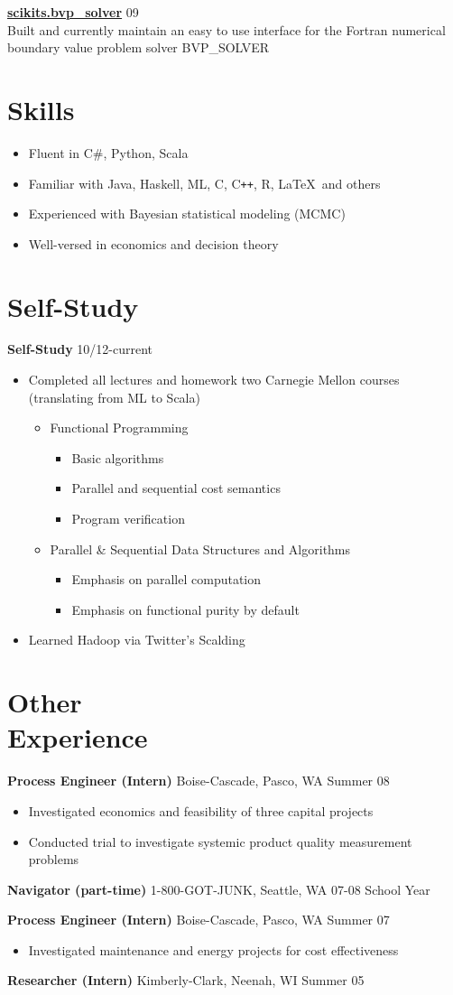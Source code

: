 \documentclass[margin]{res}
\newcommand{\bactivity}[3]{
  {\bf #1} #2 \hfill #3
    \vspace{6pt}
    \begin{itemize} \itemsep -2pt
      }
\newcommand{\eactivity}[0]{\end{itemize}}
\newcommand{\bitem}{\begin{itemize} \itemsep -2pt}
\newcommand{\eitem}{\end{itemize} }
\begin{document}
\begin{resume}
    {\bf \href{packages.python.org/scikits.bvp\_solver}{scikits.bvp\_solver}} \hfill  09\\
      Built and currently maintain an easy to use interface for the Fortran numerical boundary value problem solver BVP\_SOLVER 

\section{Skills}
    \bitem
      \item Fluent in C\#, Python, Scala
      \item Familiar with Java, Haskell, ML, C, C\verb!++!, R, \LaTeX\ and others
      \item Experienced with Bayesian statistical modeling (MCMC)
      \item Well-versed in economics and decision theory
    \eitem
    
\section{Self-Study}
 \bactivity{Self-Study}{}{10/12-current}
      \item Completed all lectures and homework two Carnegie Mellon courses (translating from ML to Scala)
      \bitem
        \item Functional Programming 
        \bitem
            \item Basic algorithms
            \item Parallel and sequential cost semantics
            \item Program verification
        \eitem
        \item Parallel \& Sequential Data Structures and Algorithms 
        \bitem 
          \item Emphasis on parallel computation
          \item Emphasis on functional purity by default
        \eitem
      \eitem
      \item Learned Hadoop via Twitter's Scalding
    \eactivity
 
  \section{Other \\ Experience}
    \bactivity{Process Engineer (Intern)}{Boise-Cascade, Pasco, WA}{Summer 08}
      \item Investigated economics and feasibility of three capital projects 
      \item Conducted trial to investigate systemic product quality measurement problems 
    \eactivity

    {\bf Navigator (part-time)} 1-800-GOT-JUNK, Seattle, WA \hfill 07-08 School Year

    \bactivity{Process Engineer (Intern)}{Boise-Cascade, Pasco, WA}{Summer 07}
      \item Investigated maintenance and energy projects for cost effectiveness 
    \eactivity

    {\bf Researcher (Intern)} Kimberly-Clark, Neenah, WI \hfill  Summer 05

\end{resume} 
\end{document}
